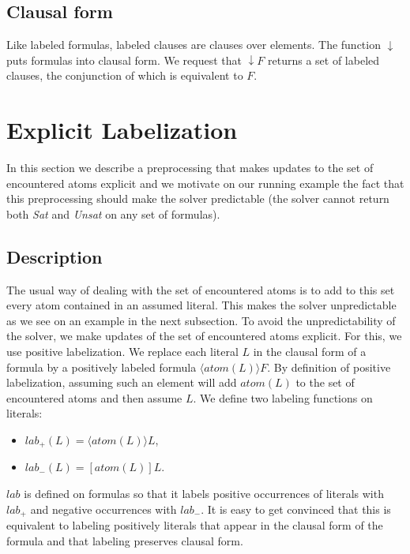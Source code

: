 \documentclass[a4paper,11pt]{article}
\newcommand{\atom}{\mathit{atom}}
\newcommand{\T}{\mathit{lab}}
\begin{document}
\subsection{Clausal form}
Like labeled formulas, labeled clauses are clauses over elements.
The function $\downarrow$ puts formulas into clausal form. We request that $\downarrow F$
returns a set of labeled clauses, the conjunction of which is equivalent to $F$.
\section{Explicit Labelization}
In this section we describe a preprocessing that makes updates to the set of encountered atoms
explicit and we motivate on our running example the fact that this preprocessing should make the solver
predictable (the solver cannot return both \emph{Sat} and \emph{Unsat} on any set of formulas).
\subsection{Description}
The usual way of dealing with the set of encountered atoms is to add to this set every atom
contained in an assumed literal. This makes the solver unpredictable as we see on an example in
the next subsection.
To avoid the unpredictability of the solver, we make updates of the set of encountered atoms explicit.
For this, we use positive labelization. We replace each literal $L$ in the clausal form of a formula
by a positively labeled formula $\langle\atom(L)\rangle F$. By definition of positive labelization,
assuming such an element will add $\atom(L)$ to the set of encountered atoms and then assume $L$.
We define two labeling functions on literals:
\begin{itemize}
 \item $\T_+(L)=\langle\atom(L)\rangle L$,
 \item $\T_-(L)=[\atom(L)]L$.
\end{itemize}
$\T$ is defined on formulas so that it labels positive occurrences of literals with $\T_+$ and
negative occurrences with $\T_-$. It is easy to get convinced that this is equivalent to labeling
positively literals that appear in the clausal form of the formula and that labeling preserves
clausal form.
\end{document}
